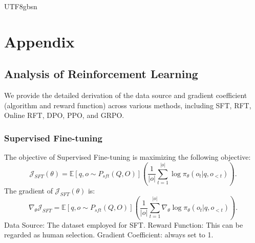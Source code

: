 \documentclass[11pt, a4paper, logo, copyright, nonumbering]{deepseek}
\begin{document}
\begin{CJK*}{UTF8}{gbsn}
\newpage



\newpage
\appendix

\section{Appendix}
\subsection{Analysis of Reinforcement Learning}
\label{app:analysis-rl}
We provide the detailed derivation of the data source and gradient coefficient (algorithm and reward function) across various methods, including SFT, RFT, Online RFT, DPO, PPO, and GRPO.

\subsubsection{Supervised Fine-tuning}
The objective of Supervised Fine-tuning is maximizing the following objective:
\begin{equation}
\mathcal{J}_{SFT}(\theta)=\mathbb{E}[q, o \sim P_{sft}(Q, O)]\left(\frac{1}{|o|}\sum_{t=1}^{|o|} \log \pi_\theta(o_t | q, o_{<t})\right).
\label{eq:mle}
\end{equation}
The gradient of $\mathcal{J}_{SFT}(\theta)$ is:
\begin{equation}
\nabla_{\theta}\mathcal{J}_{SFT} = \mathbb{E}[q, o \sim P_{sft}(Q, O)]\left(\frac{1}{|o|}\sum_{t=1}^{|o|} \nabla_{\theta} \log \pi_\theta(o_{t} | q, o_{<t})\right).
\end{equation}
Data Source: The dataset employed for SFT. Reward Function: This can be regarded as human selection. Gradient Coefficient: always set to 1.


\end{CJK*}
\end{document}
